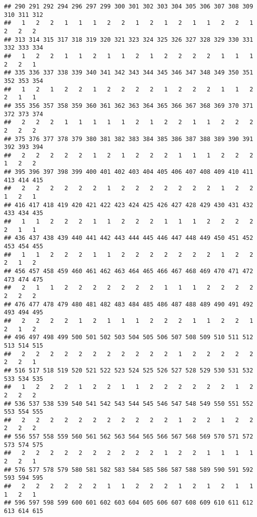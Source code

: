\documentclass[]{article}
\begin{document}
\begin{verbatim}
## 290 291 292 294 296 297 299 300 301 302 303 304 305 306 307 308 309 310 311 312 
##   1   2   2   1   1   1   2   2   1   2   1   2   1   1   2   2   1   2   2   2 
## 313 314 315 317 318 319 320 321 323 324 325 326 327 328 329 330 331 332 333 334 
##   1   2   2   1   1   2   1   1   2   1   2   2   2   2   1   1   1   2   2   1 
## 335 336 337 338 339 340 341 342 343 344 345 346 347 348 349 350 351 352 353 354 
##   1   2   1   2   2   1   2   2   2   2   1   2   2   2   1   1   2   2   1   1 
## 355 356 357 358 359 360 361 362 363 364 365 366 367 368 369 370 371 372 373 374 
##   2   2   2   1   1   1   1   1   2   1   2   2   1   1   2   2   2   2   2   2 
## 375 376 377 378 379 380 381 382 383 384 385 386 387 388 389 390 391 392 393 394 
##   2   2   2   2   2   1   2   1   2   2   2   1   1   1   2   2   2   1   2   2 
## 395 396 397 398 399 400 401 402 403 404 405 406 407 408 409 410 411 413 414 415 
##   2   2   2   2   2   2   1   2   2   2   2   2   2   2   1   2   2   1   2   1 
## 416 417 418 419 420 421 422 423 424 425 426 427 428 429 430 431 432 433 434 435 
##   1   1   2   2   2   1   1   2   2   2   1   1   1   2   2   2   2   2   1   1 
## 436 437 438 439 440 441 442 443 444 445 446 447 448 449 450 451 452 453 454 455 
##   1   1   2   2   2   1   1   2   2   2   2   2   2   2   1   2   2   2   1   2 
## 456 457 458 459 460 461 462 463 464 465 466 467 468 469 470 471 472 473 474 475 
##   2   1   1   2   2   2   2   2   2   2   1   1   1   2   2   2   2   2   2   2 
## 476 477 478 479 480 481 482 483 484 485 486 487 488 489 490 491 492 493 494 495 
##   2   2   2   2   1   2   1   1   1   2   2   2   1   1   2   2   1   2   1   2 
## 496 497 498 499 500 501 502 503 504 505 506 507 508 509 510 511 512 513 514 515 
##   2   2   2   2   2   2   2   2   2   2   2   1   2   2   2   2   2   2   2   1 
## 516 517 518 519 520 521 522 523 524 525 526 527 528 529 530 531 532 533 534 535 
##   1   2   2   2   1   2   2   1   1   2   2   2   2   2   2   1   2   2   2   2 
## 536 537 538 539 540 541 542 543 544 545 546 547 548 549 550 551 552 553 554 555 
##   2   2   2   2   2   2   2   2   2   2   2   1   2   2   1   2   2   2   2   2 
## 556 557 558 559 560 561 562 563 564 565 566 567 568 569 570 571 572 573 574 575 
##   2   2   2   2   2   2   2   2   2   2   1   2   2   1   1   1   1   2   2   1 
## 576 577 578 579 580 581 582 583 584 585 586 587 588 589 590 591 592 593 594 595 
##   2   2   2   2   2   2   1   1   2   2   2   1   2   1   2   1   1   1   2   1 
## 596 597 598 599 600 601 602 603 604 605 606 607 608 609 610 611 612 613 614 615 

\end{verbatim}
\end{document}
